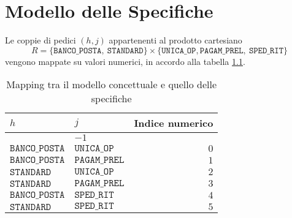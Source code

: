 \chapter{Modello delle Specifiche}\label{chp:modello-specifiche}
Le coppie di pedici $(h,j)$ appartenenti al prodotto cartesiano 
\begin{equation}
R = \lbrace \mathtt{BANCO\_POSTA},\ \mathtt{STANDARD}\rbrace \times \lbrace \mathtt{UNICA\_OP},\mathtt{PAGAM\_PREL},\ \mathtt{SPED\_RIT} \rbrace
\end{equation}
vengono mappate su valori numerici, in accordo alla tabella \ref{table:modello-specifiche-1}.
\begin{table}[ht]
\centering
{\tablecolors
\begin{tabular}{| l | l | r |}
\hline
$h$ & $j$ & Indice numerico\\
\hline
\rowcolor{airforceblue!50}
\multicolumn{2}{| c |}{$\mathtt{IDLE}$} & $-1$\\
\hline
$\mathtt{BANCO\_POSTA}$ & $\mathtt{UNICA\_OP}$ & $0$\\
\hline
$\mathtt{BANCO\_POSTA}$ & $\mathtt{PAGAM\_PREL}$ & $1$\\
\hline
$\mathtt{STANDARD}$ & $\mathtt{UNICA\_OP}$ & $2$\\
\hline
$\mathtt{STANDARD}$ & $\mathtt{PAGAM\_PREL}$ & $3$\\
\hline
$\mathtt{BANCO\_POSTA}$ & $\mathtt{SPED\_RIT}$ & $4$\\
\hline
$\mathtt{STANDARD}$ & $\mathtt{SPED\_RIT}$ & $5$\\
\hline
\end{tabular}}
\caption{Mapping tra il modello concettuale e quello delle specifiche}
\label{table:modello-specifiche-1}
\end{table}


